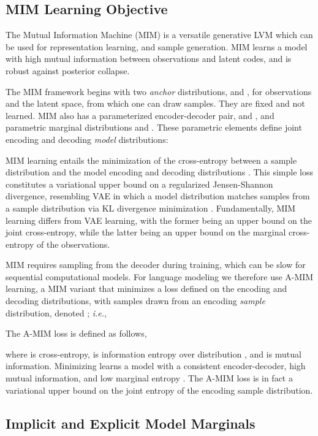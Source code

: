 \documentclass{article}
\newcommand{\ie}{{\em i.e.}}
\begin{document}
\subsection{MIM Learning Objective}
\label{sec:nlp-learning}

The Mutual Information Machine (MIM) \cite{2019arXiv191003175L} is a versatile generative LVM 
which can be used for representation learning, and sample generation.
MIM learns a model with high mutual information between observations and latent codes,
and is robust against posterior collapse. 

The MIM framework begins with two {\em anchor} distributions,  and , for
observations and the latent space, from which one can draw samples.  They are fixed and not learned.
MIM also has a parameterized encoder-decoder pair,  and ,
and parametric marginal distributions  and .
These parametric elements define joint encoding and decoding {\em model} distributions:

MIM learning entails the minimization of the cross-entropy between a sample distribution 
and the model encoding and decoding distributions \citep{2019arXiv191003175L}. 
This simple loss constitutes a variational upper bound on a regularized Jensen-Shannon divergence, 
resembling VAE in which a model distribution matches samples from a sample distribution via KL 
divergence minimization \citep{Zhao_Song_Ermon_2018}. 
Fundamentally, MIM learning differs from VAE learning, with the former being an upper bound on the 
joint cross-entropy, while the latter being an upper bound on the marginal cross-entropy of the observations.

MIM requires sampling from the decoder during training, which can be slow for sequential computational models.
For language modeling we therefore use A-MIM learning, a MIM variant that minimizes a loss
defined on the encoding and decoding distributions, with samples drawn from an encoding 
{\em sample} distribution, denoted  ;  \ie,

The A-MIM loss is defined as follows,

where  is cross-entropy,  is information entropy over
distribution , and  is mutual information.
Minimizing  learns a model with a consistent
encoder-decoder, high mutual information, and low marginal entropy \citep{2019arXiv191003175L}.
The A-MIM loss is in fact a variational upper bound on the joint entropy of the encoding 
sample distribution.



\subsection{Implicit and Explicit Model Marginals} \label{sec:nlp-variational-priors}
\end{document}
